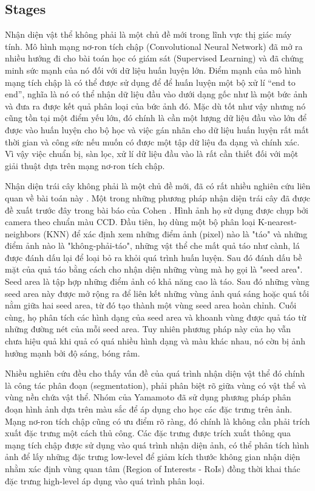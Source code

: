 \subsection{Stages}
Nhận diện vật thể không phải là một chủ đề mới trong lĩnh vực thị giác máy tính. Mô hình mạng nơ-ron tích chập (Convolutional Neural Network) đã mở ra nhiều hướng đi cho bài toán học có giám sát (Supervised Learning) và đã chứng minh sức mạnh của nó đối với dữ liệu huấn luyện lớn. Điểm mạnh của mô hình mạng tích chập là có thể được sử dụng để để huấn luyện một bộ xử lí “end to end”, nghĩa là nó có thể nhận dữ liệu đầu vào dưới dạng gốc như là một bức ảnh và đưa ra được kết quả phân loại của bức ảnh đó. Mặc dù tốt như vậy nhưng nó cũng tồn tại một điểm yếu lớn, đó chính là cần một lượng dữ liệu đầu vào lớn để được vào huấn luyện cho bộ học và việc gán nhãn cho dữ liệu huấn luyện rất mất thời gian và công sức nếu muốn có được một tập dữ liệu đa dạng và chính xác. Vì vậy việc chuẩn bị, sàn lọc, xử lí dữ liệu đầu vào là rất cần thiết đối với một giải thuật dựa trên mạng nơ-ron tích chập.

Nhận diện trái cây không phải là một chủ đề mới, đã có rất nhiều nghiên cứu liên quan về bài toán này \cite{bargoti2017image} \cite{sa2016deepfruits}. Một trong những phương pháp nhận diện trái cây đã được đề xuất trước đây trong bài báo của Cohen \cite{cohen2010estimation}. Hình ảnh họ sử dụng được chụp bởi camera theo chuẩn màu CCD. Đầu tiên, họ dùng một bộ phân loại K-nearest-neighbors (KNN) để xác định xem những điểm ảnh (pixel) nào là "táo" và những điểm ảnh nào là "không-phải-táo", những vật thể che mất quả táo như cành, lá được đánh dấu lại để loại bỏ ra khỏi quá trình huấn luyện. Sau đó đánh dấu bề mặt  của quả táo bằng cách cho nhận diện những vùng mà họ gọi là "seed area". Seed area là tập hợp những điểm ảnh có khả năng cao là táo. Sau đó những vùng seed area này được mở rộng ra để liên kết những vùng ảnh quá sáng hoặc quá tối nằm giữa hai seed area, từ đó tạo thành một vùng seed area hoàn chỉnh. Cuối cùng, họ phân tích các hình dạng của seed area và khoanh vùng được quả táo từ những đường nét của mỗi seed area. Tuy nhiên phương pháp này của họ vẫn chưa hiệu quả khi quả có quá nhiều hình dạng và màu khác nhau, nó cờn bị ảnh hưởng mạnh bởi độ sáng, bóng râm.

Nhiều nghiên cứu đều cho thấy vấn đề của quá trình nhận diện vật thể đó chính là công tác phân đoạn (segmentation), phải phân biệt rõ giữa vùng có vật thể và vùng nền chứa vật thể. Nhóm của Yamamoto \cite{yamamoto2014plant} đã sử dụng phương pháp phân đoạn hình ảnh dựa trên màu sắc để áp dụng cho học các đặc trưng trên ảnh. Mạng nơ-ron tích chập cũng có ưu điểm rõ ràng, đó chính là không cần phải trích xuất đặc trưng một cách thủ công. Các đặc trưng được trích xuất thông qua mạng tích chập được sử dụng vào quá trình nhận diện ảnh, có thể phân tích hình ảnh để lấy những đặc trưng low-level để giảm kích thước không gian nhận diện nhằm xác định vùng quan tâm (Region of Interests - RoIs) đồng thời khai thác đặc trưng high-level áp dụng vào quá trình phân loại.

